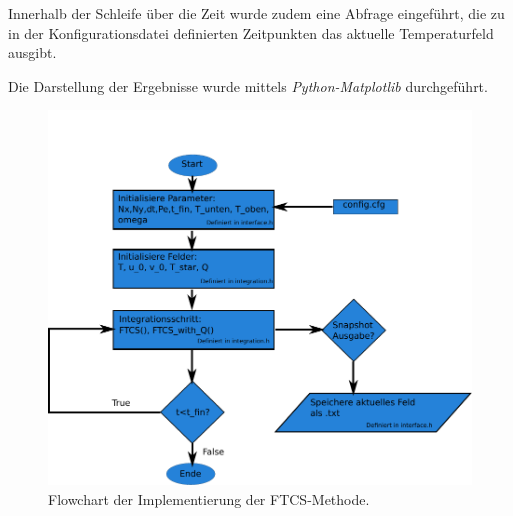 Innerhalb der Schleife über die Zeit wurde zudem eine Abfrage eingeführt, die zu in der Konfigurationsdatei definierten Zeitpunkten das aktuelle Temperaturfeld ausgibt.

Die Darstellung der Ergebnisse wurde mittels \emph{Python-Matplotlib} durchgeführt.


\begin{figure}\centering
\includegraphics[width=0.4\textheight]{FTCSflow.pdf}\caption{Flowchart der Implementierung der FTCS-Methode.}\label{fig:FTCS}
\end{figure}

